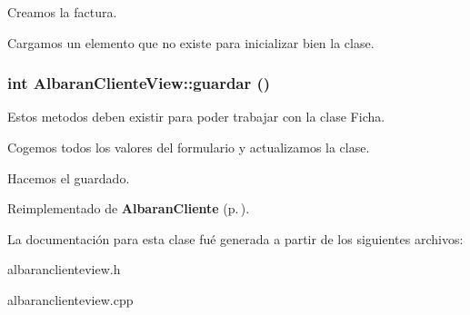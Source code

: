 Creamos la factura.

Cargamos un elemento que no existe para inicializar bien la clase. 
\subsubsection{\setlength{\rightskip}{0pt plus 5cm}int Albaran\-Cliente\-View::guardar ()\hspace{0.3cm}{\tt  [virtual]}}\label{classAlbaranClienteView_a5}


Estos metodos deben existir para poder trabajar con la clase Ficha. 

Cogemos todos los valores del formulario y actualizamos la clase.

Hacemos el guardado. 

Reimplementado de {\bf Albaran\-Cliente} {\rm (p.\,\pageref{classAlbaranCliente_a11})}.

La documentaci\'{o}n para esta clase fu\'{e} generada a partir de los siguientes archivos:\begin{CompactItemize}
\item 
albaranclienteview.h\item 
albaranclienteview.cpp\end{CompactItemize}
